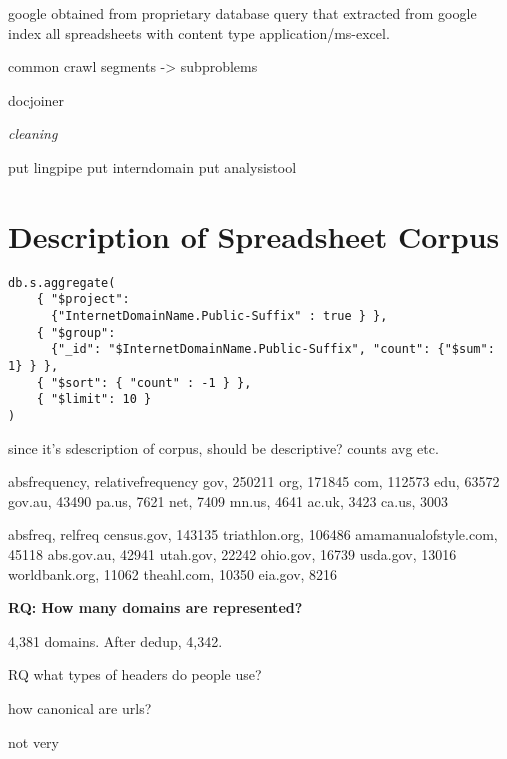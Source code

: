 \documentclass[conference]{IEEEtran}
\begin{document}
google obtained from proprietary database query that extracted from google index all spreadsheets with content type application/ms-excel.

common crawl
segments -> subproblems

docjoiner

\emph{cleaning}

put lingpipe
put interndomain
put analysistool

\section{Description of Spreadsheet Corpus}


\begin{lstlisting}
db.s.aggregate(
    { "$project": 
      {"InternetDomainName.Public-Suffix" : true } },
    { "$group": 
      {"_id": "$InternetDomainName.Public-Suffix", "count": {"$sum": 1} } },
    { "$sort": { "count" : -1 } },
    { "$limit": 10 }
)
\end{lstlisting}


since it's sdescription of corpus, should be descriptive?
counts avg etc.

absfrequency, relativefrequency
gov, 250211
org, 171845
com, 112573
edu, 63572
gov.au, 43490
pa.us, 7621
net, 7409
mn.us, 4641
ac.uk, 3423
ca.us, 3003


absfreq, relfreq
census.gov, 143135
triathlon.org, 106486
amamanualofstyle.com, 45118
abs.gov.au, 42941
utah.gov, 22242
ohio.gov, 16739
usda.gov, 13016
worldbank.org, 11062
theahl.com, 10350
eia.gov, 8216

\noindent\textbf{RQ: How many domains are represented?}

4,381 domains. After dedup, 4,342.

RQ what types of headers do people use?


how canonical are urls?

not very

\end{document}
